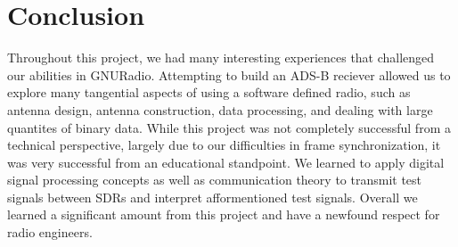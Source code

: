 \documentclass[conference, onecolumn]{IEEEtran}
\begin{document}
\section{Conclusion}
Throughout this project, we had many interesting experiences that challenged our abilities in GNURadio. Attempting to build an ADS-B reciever allowed us to explore many tangential aspects of using a software defined radio, such as antenna design, antenna construction, data processing, and dealing with large quantites of binary data. While this project was not completely successful from a technical perspective, largely due to our difficulties in frame synchronization, it was very successful from an educational standpoint. We learned to apply digital signal processing concepts as well as communication theory to transmit test signals between SDRs and interpret afformentioned test signals. Overall we learned a significant amount from this project and have a newfound respect for radio engineers.





\end{document}
